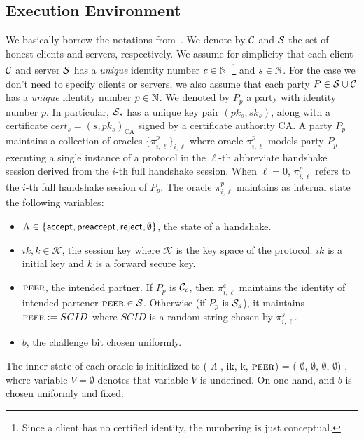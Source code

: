 \subsection{Execution Environment} \label{sec:exec_env_party}
We basically borrow the notations from~\cite{JKSS12:ACCE,KPW13:SACCE}.
We denote by $\mathcal{C}$ and $\mathcal{S}$ the set of honest clients and servers, respectively.
We assume for simplicity that each client $\mathcal{C}$ and server $\mathcal{S}$ has a \textit{unique} identity number $c \in \mathbb{N}$~\footnote{Since a client has
no certified identity, the numbering is just conceptual.}
and $s \in \mathbb{N}$.
For the case we don't need to specify clients or servers, we also assume that each party $P \in \mathcal{S} \cup \mathcal{C}$ has a \textit{unique} identity number $p \in \mathbb{N}$.
We denoted by $P_p$ a party with identity number $p$.
In particular, $\mathcal{S}_s$ has a unique key pair $(pk_s, sk_s)$, along with a certificate $cert_s=(s,pk_s)_{\text{CA}}$
signed by a certificate authority CA.
A party $P_p$ maintains a collection of oracles $\{\pi^p_{i,\ell }\}_{i,\ell}$
where oracle $\pi^p_{i, \ell}$ models party $P_p$ executing a single instance of a protocol in the $\ell$-th abbreviate handshake session
derived from  the $i$-th full handshake session.
When $\ell=0$, $\pi^p_{i,\ell}$ refers to the $i$-th full handshake session of $P_p$.
The oracle $\pi^p_{i, \ell}$ maintains as internal state the following variables:

\begin{itemize}
 \item{$\Lambda \in \{\mathsf{accept}, \mathsf{preaccept}, \mathsf{reject}, \emptyset\}$, the state of a handshake.}
 \item{$ik, k \in \mathcal{K}$, the session key where $\mathcal{K}$ is the key space of the protocol. $ik$ is a initial key and $k$ is a forward secure key.}
 \item{$\textsc{peer}$, the intended partner. If $P_p$ is $\mathcal{C}_c$, then $\pi^c_{i,\ell}$ maintains the identity of intended partener $\textsc{peer} \in \mathcal{S}$. Otherwise (if $P_p$ is $\mathcal{S}_s$), it maintains $\textsc{peer}:=SCID$ where $SCID$ is a random string chosen by $\pi^s_{i,\ell}$.}
 \item{$b$, the challenge bit chosen uniformly.}

\end{itemize}
The inner state of each oracle is initialized to
 ( $\Lambda$ , ik, k, $\textsc{peer}$) = ( $\emptyset$, $\emptyset$, $\emptyset$, $\emptyset$) ,
where variable $V=\emptyset$ denotes that variable $V$ is undefined.
On one hand, and
$b$ is chosen uniformly and fixed.

